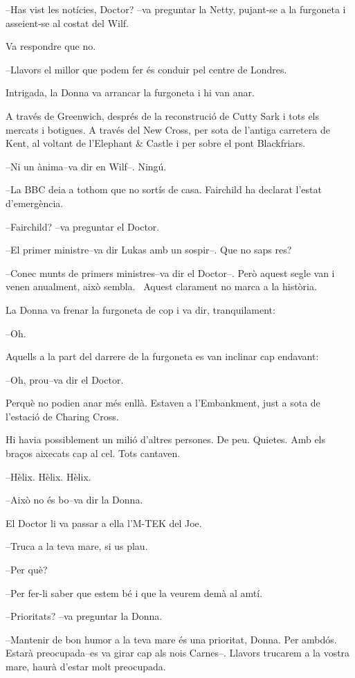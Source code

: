 --Has vist les notícies, Doctor? --va preguntar la Netty, pujant-se a la
furgoneta i asseient-se al costat del Wilf.

Va respondre que no.

--Llavors el millor que podem fer és conduir pel centre de Londres.

Intrigada, la Donna va arrancar la furgoneta i hi van anar.

A través de Greenwich, després de la reconstrució de Cutty Sark i tots
els mercats i botigues. A través del New Cross, per sota de l'antiga
carretera de Kent, al voltant de l'Elephant \& Castle i per sobre el
pont Blackfriars.

--Ni un ànima--va dir en Wilf--. Ningú.

--La BBC deia a tothom que no sortís de casa. Fairchild ha declarat
l'estat d'emergència.

--Fairchild? --va preguntar el Doctor.

--El primer ministre--va dir Lukas amb un sospir--. Que no saps res?

--Conec munts de primers ministres--va dir el Doctor--. Però aquest
segle van i venen anualment, això sembla. ~Aquest clarament no marca a
la història.

La Donna va frenar la furgoneta de cop i va dir, tranquilament:

--Oh.

Aquells a la part del darrere de la furgoneta es van inclinar cap
endavant:

--Oh, prou--va dir el Doctor.

Perquè no podien anar més enllà. Estaven a l'Embankment, just a sota de
l'estació de Charing Cross.

Hi havia possiblement un milió d'altres persones. De peu. Quietes. Amb
els braços aixecats cap al cel. Tots cantaven.

--Hèlix. Hèlix. Hèlix.

--Això no és bo--va dir la Donna.

El Doctor li va passar a ella l'M-TEK del Joe.

--Truca a la teva mare, si us plau.

--Per què?

--Per fer-li saber que estem bé i que la veurem demà al amtí.

--Prioritats? --va preguntar la Donna.

--Mantenir de bon humor a la teva mare és una prioritat, Donna. Per
ambdós. Estarà preocupada--es va girar cap als nois Carnes--. Llavors
trucarem a la vostra mare, haurà d'estar molt preocupada.

